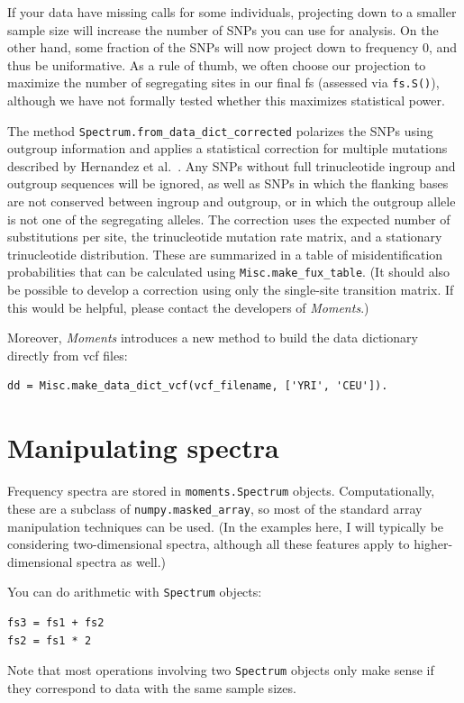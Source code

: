 \documentclass[12pt]{article}
\makeatletter
\newcommand{\py}[1]{\lstinline[language=Python, showstringspaces=False]@#1@}
\makeatother
\begin{document}
If your data have missing calls for some individuals, projecting down to a smaller sample size will increase the number of SNPs you can use for analysis.
On the other hand, some fraction of the SNPs will now project down to frequency 0, and thus be uniformative.
As a rule of thumb, we often choose our projection to maximize the number of segregating sites in our final fs (assessed via \py{fs.S()}), although we have not formally tested whether this maximizes statistical power.

The method \py{Spectrum.from_data_dict_corrected} polarizes the SNPs using outgroup information and applies a statistical correction for multiple mutations described by Hernandez et al.~\cite{bib:Hernandez2007}.
Any SNPs without full trinucleotide ingroup and outgroup sequences will be ignored, as well as SNPs in which the flanking bases are not conserved between ingroup and outgroup, or in which the outgroup allele is not one of the segregating alleles.
The correction uses the expected number of substitutions per site, the trinucleotide mutation rate matrix, and a stationary trinucleotide distribution.
These are summarized in a table of misidentification probabilities that can be calculated using \py{Misc.make_fux_table}.
(It should also be possible to develop a correction using only the single-site transition matrix.
If this would be helpful, please contact the developers of \textit{Moments}.)

Moreover, \textit{Moments} introduces a new method to build the data dictionary directly from vcf files: 
\begin{lstlisting}
dd = Misc.make_data_dict_vcf(vcf_filename, ['YRI', 'CEU']).
\end{lstlisting}

\section{Manipulating spectra}\label{sec:manip}

Frequency spectra are stored in \py{moments.Spectrum} objects.
Computationally, these are a subclass of \py{numpy.masked_array}, so most of the standard array manipulation techniques can be used.
(In the examples here, I will typically be considering two-dimensional spectra, although all these features apply to higher-dimensional spectra as well.)

You can do arithmetic with \py{Spectrum} objects:
\begin{lstlisting}
fs3 = fs1 + fs2
fs2 = fs1 * 2
\end{lstlisting}
Note that most operations involving two \py{Spectrum} objects only make sense if they correspond to data with the same sample sizes.
\end{document}
